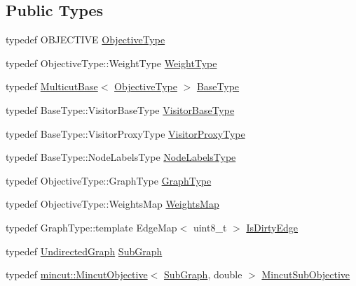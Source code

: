 \subsection*{Public Types}
\begin{DoxyCompactItemize}
\item 
typedef O\+B\+J\+E\+C\+T\+I\+VE \hyperlink{classnifty_1_1graph_1_1opt_1_1multicut_1_1Cgc_aa83ae7cd167c0580c61f1d4eab63eb9a}{Objective\+Type}
\item 
typedef Objective\+Type\+::\+Weight\+Type \hyperlink{classnifty_1_1graph_1_1opt_1_1multicut_1_1Cgc_af53c2aba41be6fa0cb8eebe36535c7f2}{Weight\+Type}
\item 
typedef \hyperlink{classnifty_1_1graph_1_1opt_1_1multicut_1_1MulticutBase}{Multicut\+Base}$<$ \hyperlink{classnifty_1_1graph_1_1opt_1_1multicut_1_1Cgc_aa83ae7cd167c0580c61f1d4eab63eb9a}{Objective\+Type} $>$ \hyperlink{classnifty_1_1graph_1_1opt_1_1multicut_1_1Cgc_ad2d9dfafea18de663be6d8d606208eec}{Base\+Type}
\item 
typedef Base\+Type\+::\+Visitor\+Base\+Type \hyperlink{classnifty_1_1graph_1_1opt_1_1multicut_1_1Cgc_a6d429c6a15de0e6fb98c94ad4fec14f0}{Visitor\+Base\+Type}
\item 
typedef Base\+Type\+::\+Visitor\+Proxy\+Type \hyperlink{classnifty_1_1graph_1_1opt_1_1multicut_1_1Cgc_adcf3daafa9b0dc9ee588340c642f8e3a}{Visitor\+Proxy\+Type}
\item 
typedef Base\+Type\+::\+Node\+Labels\+Type \hyperlink{classnifty_1_1graph_1_1opt_1_1multicut_1_1Cgc_a19f52bf3f00bed2816bd44604b94e7af}{Node\+Labels\+Type}
\item 
typedef Objective\+Type\+::\+Graph\+Type \hyperlink{classnifty_1_1graph_1_1opt_1_1multicut_1_1Cgc_a1bf592e68d35a31ed33ec5e039c091f3}{Graph\+Type}
\item 
typedef Objective\+Type\+::\+Weights\+Map \hyperlink{classnifty_1_1graph_1_1opt_1_1multicut_1_1Cgc_aa8c539cff0d978f8688f362d304a6565}{Weights\+Map}
\item 
typedef Graph\+Type\+::template Edge\+Map$<$ uint8\+\_\+t $>$ \hyperlink{classnifty_1_1graph_1_1opt_1_1multicut_1_1Cgc_a48d2d24aa33855afcd15aceb444c3cd4}{Is\+Dirty\+Edge}
\item 
typedef \hyperlink{classnifty_1_1graph_1_1UndirectedGraph}{Undirected\+Graph} \hyperlink{classnifty_1_1graph_1_1opt_1_1multicut_1_1Cgc_a52317a6524a87782b8c6cc8cd27fa9fc}{Sub\+Graph}
\item 
typedef \hyperlink{classnifty_1_1graph_1_1opt_1_1mincut_1_1MincutObjective}{mincut\+::\+Mincut\+Objective}$<$ \hyperlink{classnifty_1_1graph_1_1opt_1_1multicut_1_1Cgc_a52317a6524a87782b8c6cc8cd27fa9fc}{Sub\+Graph}, double $>$ \hyperlink{classnifty_1_1graph_1_1opt_1_1multicut_1_1Cgc_ad046a519bbf2e0753e9bb0db0ce62fa0}{Mincut\+Sub\+Objective}

\end{DoxyCompactItemize}
